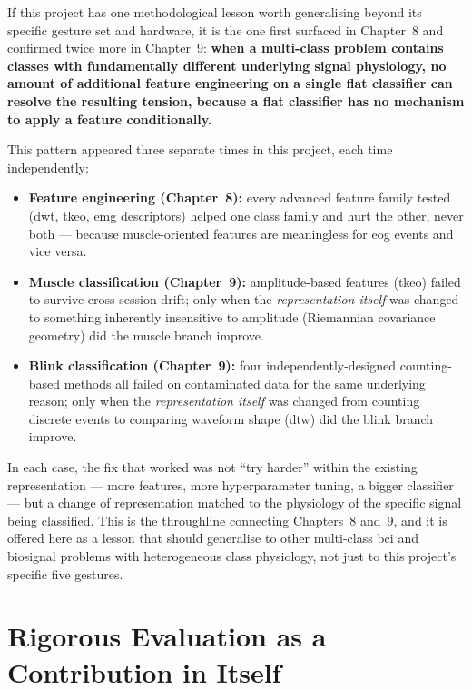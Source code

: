If this project has one methodological lesson worth generalising
beyond its specific gesture set and hardware, it is the one first
surfaced in Chapter~8 and confirmed twice more in Chapter~9:
\textbf{when a multi-class problem contains classes with
fundamentally different underlying signal physiology, no amount of
additional feature engineering on a single flat classifier can
resolve the resulting tension, because a flat classifier has no
mechanism to apply a feature conditionally.}

This pattern appeared three separate times in this project, each
time independently:

\begin{itemize}[leftmargin=*]
    \item \textbf{Feature engineering (Chapter~8):} every advanced
    feature family tested (\acrshort{dwt}, \acrshort{tkeo},
    \acrshort{emg} descriptors) helped one class family and hurt
    the other, never both --- because muscle-oriented features are
    meaningless for \acrshort{eog} events and vice versa.
    \item \textbf{Muscle classification (Chapter~9):} amplitude-based
    features (\acrshort{tkeo}) failed to survive cross-session
    drift; only when the \emph{representation itself} was changed
    to something inherently insensitive to amplitude (Riemannian
    covariance geometry) did the muscle branch improve.
    \item \textbf{Blink classification (Chapter~9):} four
    independently-designed counting-based methods all failed on
    contaminated data for the same underlying reason; only when the
    \emph{representation itself} was changed from counting discrete
    events to comparing waveform shape (\acrshort{dtw}) did the
    blink branch improve.
\end{itemize}

In each case, the fix that worked was not ``try harder'' within the
existing representation --- more features, more hyperparameter
tuning, a bigger classifier --- but a change of representation
matched to the physiology of the specific signal being classified.
This is the throughline connecting Chapters~8 and~9, and it is
offered here as a lesson that should generalise to other multi-class
\acrshort{bci} and biosignal problems with heterogeneous class
physiology, not just to this project's specific five gestures.

\section{Rigorous Evaluation as a Contribution in Itself}
\label{sec:disc_evaluation}

